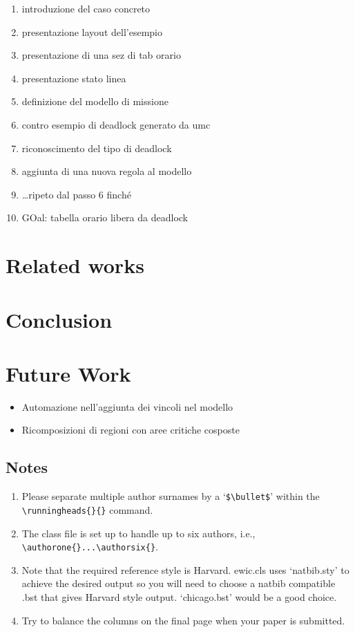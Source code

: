\documentclass{ewic}
\begin{document}
			
			\begin{enumerate}
			\item introduzione del caso concreto
			\item presentazione layout dell'esempio
			\item presentazione di una sez di tab orario
			\item presentazione stato linea
			\item definizione del modello di missione
			\item contro esempio di deadlock generato da umc
			\item riconoscimento del tipo di deadlock
			\item aggiunta di una nuova regola al modello
			\item \ldots ripeto dal passo 6 finch\'{e}
			\item GOal: tabella orario libera da deadlock
			\end{enumerate}
			
			\section{Related works}
			\section{Conclusion}
			\section{Future Work}
			\begin{itemize}
			\item Automazione nell'aggiunta dei vincoli nel modello
			\item Ricomposizioni di regioni con aree critiche cosposte
			\end{itemize}
			
			
			\pagebreak
			\subsection{Notes}
			\begin{enumerate}
			\item Please separate multiple author surnames by a `\verb+$\bullet$+' within the
			\verb+\runningheads{}{}+ command.
			
			\item The class file is set up to handle up to six authors, i.e., \verb+\authorone{}...\authorsix{}+.
			
			\item Note that the required reference style is Harvard. ewic.cls
			uses `natbib.sty' to achieve the desired output so you will need
			to choose a natbib compatible .bst that gives Harvard style
			output. `chicago.bst' would be a good choice.
			
			\item Try to balance the columns on the final page when your paper is submitted.
			\end{enumerate}
			
\end{document}
